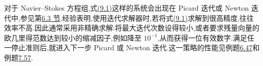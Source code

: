 \begin{note}
\label{note:chapter9-inexact-strategy}
对于 Navier--Stokes 方程组,式\hyperref[eq:chapter9-coupled-system]{(9.1)}这样的系统会出现在 Picard 迭代或 Newton 迭代中,参见第\hyperref[sec:steady-ns-iterations]{6.3 节}.经验表明,使用迭代求解器时,若将式\hyperref[eq:chapter9-coupled-system]{(9.1)}求解到很高精度,往往效率不高.因此通常采用非精确求解:将最大迭代次数设得较小,或者要求残量向量的欧几里得范数达到较小的缩减因子,例如降至 $10^{-1}$,从而获得一位有效数字.满足任一停止准则后,就进入下一步 Picard 或 Newton 迭代.这一策略的性能见例题\hyperref[ex:steady-ns-picard-vs-newton]{6.47}和例题\hyperref[ex:time-dependent-picard-vs-newton]{7.57}.
\end{note}



